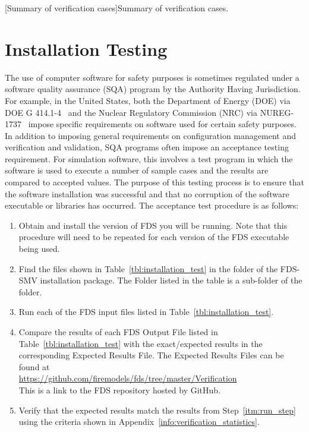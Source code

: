 \documentclass[11pt]{book}
\begin{document}
\begin{landscape}
[Summary of verification cases]{Summary of verification cases.} \label{summary_table}
\end{landscape}



\chapter{Installation Testing}
\label{info:installation_testing}

The use of computer software for safety purposes is sometimes regulated under a software quality assurance (SQA) program by the Authority Having Jurisdiction.  For example, in the United States, both the Department of Energy (DOE) via DOE G 414.1-4~\cite{DOE_G_414} and the Nuclear Regulatory Commission (NRC) via NUREG-1737~\cite{NUREG_1737} impose specific requirements on software used for certain safety purposes.  In addition to imposing general requirements on configuration management and verification and validation, SQA programs often impose an acceptance testing requirement.  For simulation software, this involves a test program in which the software is used to execute a number of sample cases and the results are compared to accepted values.  The purpose of this testing process is to ensure that the software installation was successful and that no corruption of the software executable or libraries has occurred. The acceptance test procedure is as follows:

\begin{enumerate}
\item Obtain and install the version of FDS you will be running.  Note that this procedure will need to be repeated for each version of the FDS executable being used.
\item Find the files shown in Table~\ref{tbl:installation_test} in the  folder of the FDS-SMV installation package.  The Folder listed in the table is a sub-folder of the  folder.
\item Run each of the FDS input files listed in Table~\ref{tbl:installation_test}. \label{itm:run_step}
\item Compare the results of each FDS Output File listed in Table~\ref{tbl:installation_test} with the exact/expected results in the corresponding Expected Results File. The Expected Results Files can be found at \\ \href{https://github.com/firemodels/fds/tree/master/Verification}{https://github.com/firemodels/fds/tree/master/Verification} \\
    This is a link to the FDS repository hosted by GitHub.
\item Verify that the expected results match the results from Step~\ref{itm:run_step} using the criteria shown in Appendix~\ref{info:verification_statistics}.
\end{enumerate}
\end{document}
